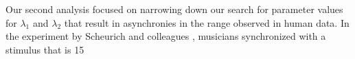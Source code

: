 \documentclass{report}
\begin{document}
Our second analysis focused on narrowing down our search for parameter values for $\lambda_1$ and $\lambda_2$ that result in asynchronies in the range observed in human data. In the experiment by Scheurich and colleagues \cite{scheurich2018tapping}, musicians synchronized with a stimulus that is 15%
\end{document}
